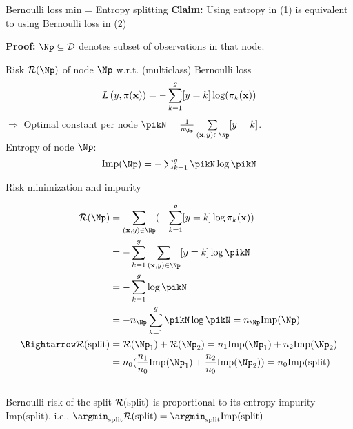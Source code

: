 \documentclass[11pt,compress,t,notes=noshow, xcolor=table]{beamer}
\begin{document}
\begin{frame}{Bernoulli loss min = Entropy splitting}
\textbf{Claim:} Using entropy in (1) 
    is equivalent to using Bernoulli loss in (2) %

\textbf{Proof:} %
$\Np \subseteq \D$ denotes subset of observations in that node. 

Risk $\risk(\Np)$ of node $\Np$ w.r.t. (multiclass) Bernoulli loss  
$$
  L\left(y, \pi(\mathbf{x})\right) = -\sum_{k = 1}^g [y = k] \log (\pi_k(\mathbf{x}))
$$
$\Rightarrow$ Optimal constant per node $\pikN = \frac{1}{n_{\Np}} \sum\limits_{(\xv,y) \in \Np} [y = k]$.\\

Entropy of node $\Np$:
$$
\text{Imp}(\Np) = -\textstyle\sum_{k = 1}^g \pikN \log \pikN %
$$

\end{frame}
\begin{frame2}[footnotesize]{Risk minimization and impurity}

\begin{align*}
\risk(\Np) &= \sum_{\xy \in \Np} (- \sum_{k = 1}^g [y = k] \log \pi_k(\xv) ) \\
&= -\sum_{k = 1}^g \sum_{\xy \in \Np} [y = k]\log \pikN \\
&= -\sum_{k = 1}^g \log \pikN %
\\
 &= -n_{\Np} \sum_{k = 1}^g \pikN \log \pikN = n_\Np \text{Imp}(\Np)\\
 \Rightarrow \risk(\text{split}) &= \risk(\Np_1) + \risk(\Np_2)  = n_1 \text{Imp}(\Np_1) + n_2 \text{Imp}(\Np_2)\\
 &=n_0 (\frac{n_1}{n_0} \text{Imp}(\Np_1) + \frac{n_2}{n_0} \text{Imp}(\Np_2)) = n_0\text{Imp(split)}\\
\
\end{align*} 
Bernoulli-risk of the split $\mathcal{R}(\text{split})$ is proportional to its entropy-impurity $\text{Imp(split)}$, i.e., $\argmin_\text{split} \risk(\text{split}) = \argmin_\text{split} \text{Imp(split)}$ \\

\end{frame2}
\end{document}
